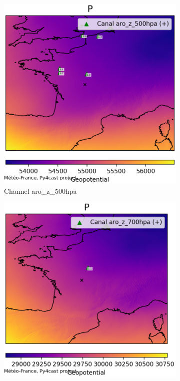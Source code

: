 \begin{figure}[h]
\begin{subfigure}[b]{0.44\textwidth}
        \includegraphics[width=\textwidth]{Images/titan_rain_anchors/nov-21/complete/2023112100_feature_aro_z_500hpa.png}
        \caption{Channel aro\_z\_500hpa}
    \end{subfigure}
    \hfill
    \begin{subfigure}[b]{0.44\textwidth}
        \includegraphics[width=\textwidth]{Images/titan_rain_anchors/nov-21/complete/2023112100_feature_aro_z_700hpa.png}

\end{subfigure}
\end{figure}
